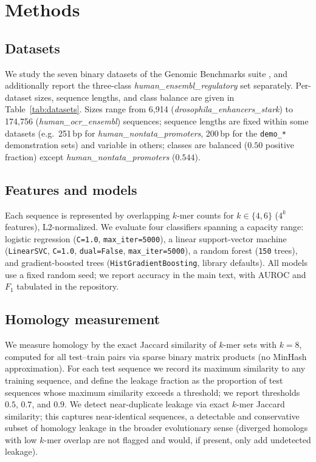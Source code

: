 \documentclass[webpdf,modern,large,namedate]{oup-authoring-template}%
\begin{document}
\section{Methods}

\subsection{Datasets}
We study the seven binary datasets of the Genomic Benchmarks suite \citep{gresova2023}, and additionally report the three-class \textit{human\_ensembl\_regulatory} set separately. Per-dataset sizes, sequence lengths, and class balance are given in Table~\ref{tab:datasets}. Sizes range from 6{,}914 (\textit{drosophila\_enhancers\_stark}) to 174{,}756 (\textit{human\_ocr\_ensembl}) sequences; sequence lengths are fixed within some datasets (e.g.\ 251\,bp for \textit{human\_nontata\_promoters}, 200\,bp for the \texttt{demo\_*} demonstration sets) and variable in others; classes are balanced ($0.50$ positive fraction) except \textit{human\_nontata\_promoters} ($0.544$).

\subsection{Features and models}
Each sequence is represented by overlapping $k$-mer counts for $k\in\{4,6\}$ ($4^k$ features), L2-normalized. We evaluate four classifiers spanning a capacity range: logistic regression (\texttt{C=1.0}, \texttt{max\_iter=5000}), a linear support-vector machine (\texttt{LinearSVC}, \texttt{C=1.0}, \texttt{dual=False}, \texttt{max\_iter=5000}), a random forest (\texttt{150} trees), and gradient-boosted trees (\texttt{HistGradientBoosting}, library defaults). All models use a fixed random seed; we report accuracy in the main text, with AUROC and $F_1$ tabulated in the repository.

\subsection{Homology measurement}
We measure homology by the exact Jaccard similarity of $k$-mer sets with $k=8$, computed for all test--train pairs via sparse binary matrix products (no MinHash approximation). For each test sequence we record its maximum similarity to any training sequence, and define the leakage fraction as the proportion of test sequences whose maximum similarity exceeds a threshold; we report thresholds $0.5$, $0.7$, and $0.9$. We detect near-duplicate leakage via exact $k$-mer Jaccard similarity; this captures near-identical sequences, a detectable and conservative subset of homology leakage in the broader evolutionary sense (diverged homologs with low $k$-mer overlap are not flagged and would, if present, only add undetected leakage).
\end{document}
